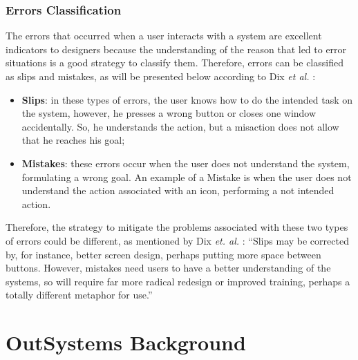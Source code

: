 

\subsubsection{Errors Classification}
\label{subsubsec:errors_classification}
The errors that occurred when a user interacts with a system are excellent indicators to designers because the understanding of the reason that led to error situations is a good strategy to classify them. Therefore, errors can be classified as slips and mistakes, as will be presented below according to Dix \textit{et al.} \cite{humanComputerInteraction}:

\begin{itemize}
	\item \textbf{Slips}: in these types of errors, the user knows how to do the intended task on the system, however, he presses a wrong button or closes one window accidentally. So, he understands the action, but a misaction does not allow that he reaches his goal;
	\item \textbf{Mistakes}: these errors occur when the user does not understand the system, formulating a wrong goal. An example of a Mistake is when the user does not understand the action associated with an icon, performing a not intended action.
\end{itemize}

Therefore, the strategy to mitigate the problems associated with these two types of errors could be different, as mentioned by Dix \textit{et. al.} \cite{humanComputerInteraction}: “Slips may be corrected by, for instance, better screen design, perhaps putting more space between buttons. However, mistakes need users to have a better understanding of the systems, so will require far more radical redesign or improved training, perhaps a totally different metaphor for use.”


\section{OutSystems Background}
\label{sec:outsystems_background}

